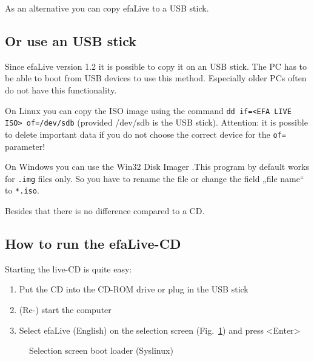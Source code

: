 \documentclass[a4paper,12pt,twoside]{article}
\begin{document}
As an alternative you can copy efaLive to a USB stick.


\subsection{Or use an USB stick}
\label{sct:usb_stick}
Since efaLive version 1.2 it is possible to copy it on an USB stick. The
PC has to be able to boot from USB devices to use this method.
Especially older PCs often do not have this functionality.

On Linux you can copy the ISO image using the command \texttt{dd
if={\textless}EFA LIVE ISO{\textgreater} of=/dev/sdb}
(provided /dev/sdb is the USB stick). Attention: it is possible to
delete important data if you do not choose the correct device for the
\texttt{of=} parameter!

On Windows you can use the Win32 Disk Imager \cite{IMG1}.This program by
default works for \texttt{.img} files only. So you
have to rename the file or change the field „file name“ to
\texttt{*.iso}.

Besides that there is no difference compared to a CD.


\subsection{How to run the efaLive-CD}
\label{sct:live_run}
Starting the live-CD is quite easy:

\begin{enumerate}
    \item Put the CD into the CD-ROM drive or plug in the USB stick
    \item (Re-) start the computer
    \item Select efaLive (English) on the selection screen
(Fig.~\ref{fig:syslinux}) and press {\textless}Enter{\textgreater}
\end{enumerate}

\begin{figure}
    \centering
    \caption{Selection screen boot loader (Syslinux)}
    \label{fig:syslinux}
\end{figure}
\end{document}
